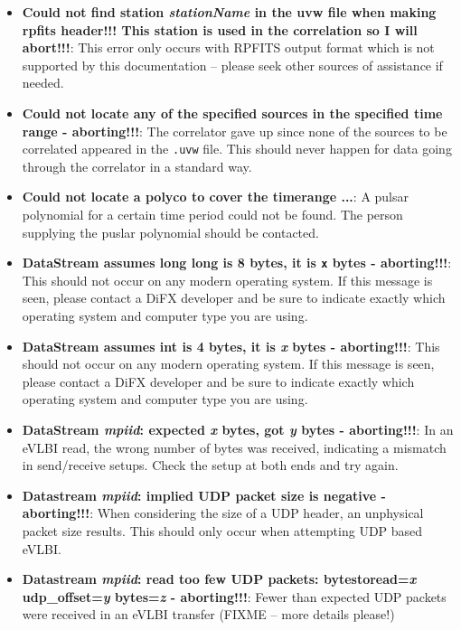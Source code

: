 \begin{itemize}
\item {\bf Could not find station {\it stationName} in the uvw file when making rpfits header!!!  This station is used in the correlation so I will abort!!!}:
This error only occurs with RPFITS output format which is not supported by this documentation -- please seek other sources of assistance if needed.

\item {\bf Could not locate any of the specified sources in the specified time range - aborting!!!}:
The correlator gave up since none of the sources to be correlated appeared in the {\tt .uvw} file.
This should never happen for data going through the correlator in a standard way.

\item {\bf Could not locate a polyco to cover the timerange ...}:
A pulsar polynomial for a certain time period could not be found.
The person supplying the puslar polynomial should be contacted.

\item {\bf DataStream assumes long long is 8 bytes, it is {\tt x} bytes - aborting!!!}:
This should not occur on any modern operating system.
If this message is seen, please contact a DiFX developer and be sure to indicate exactly which operating system and computer type you are using.

\item {\bf DataStream assumes int is 4 bytes, it is {\it x} bytes - aborting!!!}:
This should not occur on any modern operating system.
If this message is seen, please contact a DiFX developer and be sure to indicate exactly which operating system and computer type you are using.

\item {\bf DataStream {\it mpiid}: expected {\it x} bytes, got {\it y} bytes - aborting!!!}:
In an eVLBI read, the wrong number of bytes was received, indicating a mismatch in send/receive setups.
Check the setup at both ends and try again.

\item {\bf Datastream {\it mpiid}: implied UDP packet size is negative - aborting!!!}:
When considering the size of a UDP header, an unphysical packet size results.
This should only occur when attempting UDP based eVLBI.

\item {\bf Datastream {\it mpiid}: read too few UDP packets: bytestoread={\it x} udp\_offset={\it y} bytes={\it z} - aborting!!!}:
Fewer than expected UDP packets were received in an eVLBI transfer (FIXME -- more details please!)


\end{itemize}
